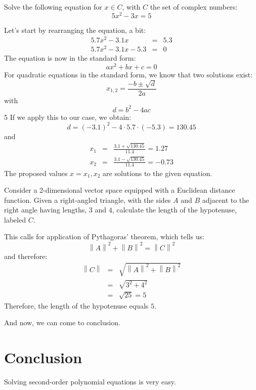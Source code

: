 \documentclass[a4paper,10pt]{article}
\begin{document}
\begin{exercises}[columns = 2]
\begin{exercise}
Solve the following equation for $x \in C$, with $C$ the set of
complex numbers:
\begin{equation}
5 x^2 -3 x = 5
\end{equation}
\end{exercise}
\begin{solution}
Let’s start by rearranging the equation, a bit:
\begin{eqnarray}
5.7 x^2 - 3.1 x &=& 5.3\\
5.7 x^2 - 3.1 x -5.3 &=& 0
\end{eqnarray}
The equation is now in the standard form:
\begin{equation}
a x^2 + b x + c = 0
\end{equation}
For quadratic equations in the standard form, we know that two
solutions exist:
\begin{equation}
x_{1,2} = \frac{ -b \pm \sqrt{d}}{2a}
\end{equation}
with
\begin{equation}
d = b^2 - 4 a c
\end{equation}
5
If we apply this to our case, we obtain:
\begin{equation}
d = (-3.1)^2 - 4 \cdot 5.7 \cdot (-5.3) = 130.45
\end{equation}
and
\begin{eqnarray}
x_1 &=& \frac{3.1 + \sqrt{130.45}}{11.4} = 1.27\\
x_2 &=& \frac{3.1 - \sqrt{130.45}}{11.4} = -0.73
\end{eqnarray}
The proposed values $x = x_1, x_2$ are solutions to the given equation.
\end{solution}
\begin{exercise}
Consider a 2-dimensional vector space equipped with a Euclidean
distance function. Given a right-angled triangle, with the sides
$A$ and $B$ adjacent to the right angle having lengths, $3$ and
$4$, calculate the length of the hypotenuse, labeled $C$.
\end{exercise}
\begin{solution}
This calls for application of Pythagoras’ theorem, which
tells us:
\begin{equation}
\left\|A\right\|^2 + \left\|B\right\|^2 = \left\|C\right\|^2
\end{equation}
and therefore:
\begin{eqnarray}
\left\|C\right\|
&=& \sqrt{\left\|A\right\|^2 + \left\|B\right\|^2}\\
&=& \sqrt{3^2 + 4^2}\\
&=& \sqrt{25} = 5
\end{eqnarray}
Therefore, the length of the hypotenuse equals $5$.
\end{solution}
\end{exercises}
And now, we can come to conclusion.
\section{Conclusion}
Solving second-order polynomial equations is very easy.
\end{document}
